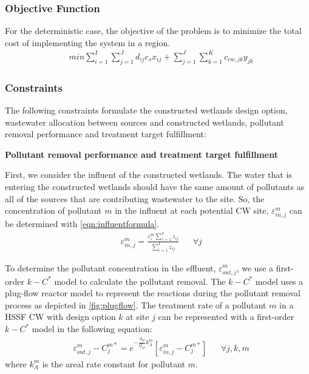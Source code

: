 \documentclass[preprint,12pt,authoryear]{elsarticle}
\begin{document}
\subsubsection{Objective Function}
For the deterministic case, the objective of the problem is to minimize the total cost of implementing the system in a region. 
\begin{align}
	&min \sum_{i=1}^I \sum_{j=1}^J d_{ij} c_s x_{ij} + \sum_{j=1}^J \sum_{k=1}^K c_{cw,jk} y_{jk}
\end{align}

\subsubsection{Constraints}
The following constraints formulate the constructed wetlands design option, wastewater allocation between sources and constructed wetlands, pollutant removal performance and treatment target fulfillment:


\noindent\textbf{Pollutant removal performance and treatment target fulfillment} 

First, we consider the influent of the constructed wetlands. The water that is entering the constructed wetlands should have the same amount of pollutants as all of the sources that are contributing wastewater to the site. So, the concentration of pollutant $m$ in the influent at each potential CW site, $\varepsilon_{in,j}^m$ can be determined with \autoref{eqn:influentformula}.
\begin{align} \label{eqn:influentformula}
	&\varepsilon_{in,j}^m = \frac{\varepsilon_i^m \sum_{i=1}^I z_{ij}}{\sum_{i=1}^I z_{ij}} && \forall j
\end{align}

To determine the pollutant concentration in the effluent, $\varepsilon_{out,j}^m$, we use a first-order $k-C^*$ model \citep{rousseau2004model} to calculate the pollutant removal. The $k-C^*$ model uses a plug-flow reactor model to represent the reactions during the pollutant removal process as depicted in \autoref{fig:plugflow}. The treatment rate of a pollutant $m$ in a HSSF CW with design option $k$ at site $j$ can be represented with a first-order $k-C^*$ model in the following equation:
\begin{align}
	\label{eqn:plugflow}
	&\varepsilon_{out,j}^m - C_j^{m*} = e^{-\frac{A_{jk}}{Q_{jk}}k_A^m} [\varepsilon_{in,j}^m - C_j^{m*}] && \forall j,k,m
\end{align}
where $k_A^m$ is the areal rate constant for pollutant $m$.
\end{document}

